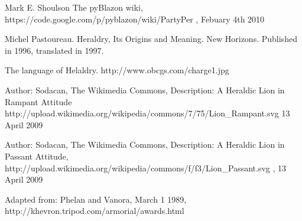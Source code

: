 \begin{thebibliography}{100}

  	Mark E. Shoulson
 	The pyBlazon wiki, 
 	https://code.google.com/p/pyblazon/wiki/PartyPer , 
 	Febuary 4th 2010


	Michel Pastoureau. 
	Heraldry, Its Origins and Meaning.
	New Horizons. 
	Published in 1996, translated in 1997.


	The language of Helaldry.
	http://www.obcgs.com/charge1.jpg

	Author: Sodacan,  
	The Wikimedia Commons,
	Description: A Heraldic Lion in Rampant Attitude
	http://upload.wikimedia.org/wikipedia/commons/7/75/Lion\_Rampant.svg
	13 April 2009

	Author: Sodacan,
	The Wikimedia Commons, 
	Description: A Heraldic Lion in Passant Attitude, 
	http://upload.wikimedia.org/wikipedia/commons/f/f3/Lion\_Passant.svg ,
	13 April 2009
	
	Adapted from: 
	Phelan and Vanora, 
	March 1 1989, 
	http://khevron.tripod.com/armorial/awards.html





\end{thebibliography}
